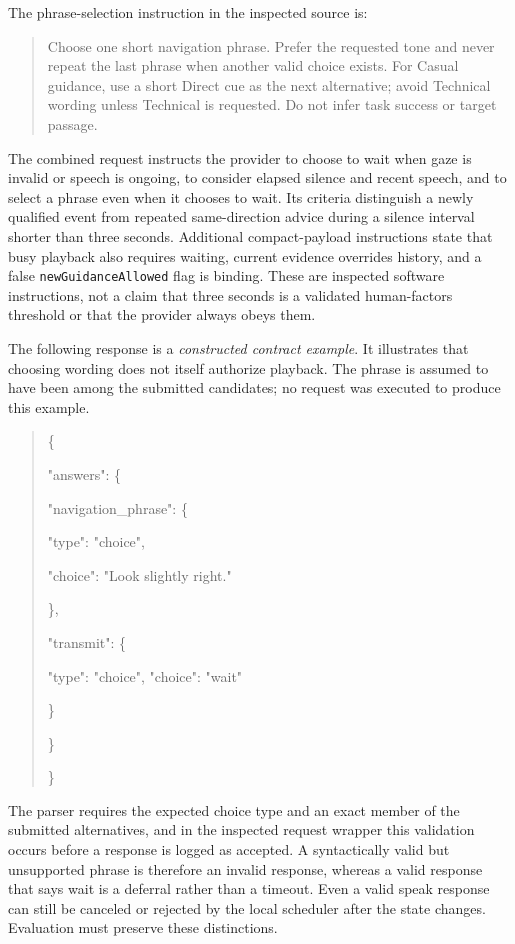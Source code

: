 The phrase-selection instruction in the inspected source is:
\begin{quote}\small
Choose one short navigation phrase. Prefer the requested tone and never repeat the last phrase when another valid choice exists. For Casual guidance, use a short Direct cue as the next alternative; avoid Technical wording unless Technical is requested. Do not infer task success or target passage.
\end{quote}

The combined request instructs the provider to choose to wait when gaze is invalid or speech is ongoing, to consider elapsed silence and recent speech, and to select a phrase even when it chooses to wait. Its criteria distinguish a newly qualified event from repeated same-direction advice during a silence interval shorter than three seconds. Additional compact-payload instructions state that busy playback also requires waiting, current evidence overrides history, and a false \texttt{newGuidanceAllowed} flag is binding. These are inspected software instructions, not a claim that three seconds is a validated human-factors threshold or that the provider always obeys them.

The following response is a \emph{constructed contract example}. It illustrates that choosing wording does not itself authorize playback. The phrase is assumed to have been among the submitted candidates; no request was executed to produce this example.
\begin{quote}\begin{minipage}{\linewidth}\small\ttfamily\singlespacing
\{\par
\quad "answers": \{\par
\qquad "navigation\_phrase": \{\par
\qquad\quad "type": "choice",\par
\qquad\quad "choice": "Look slightly right."\par
\qquad \},\par
\qquad "transmit": \{\par
\qquad\quad "type": "choice", "choice": "wait"\par
\qquad \}\par
\quad \}\par
\}
\end{minipage}\end{quote}

The parser requires the expected choice type and an exact member of the submitted alternatives, and in the inspected request wrapper this validation occurs before a response is logged as accepted. A syntactically valid but unsupported phrase is therefore an invalid response, whereas a valid response that says wait is a deferral rather than a timeout. Even a valid speak response can still be canceled or rejected by the local scheduler after the state changes. Evaluation must preserve these distinctions.

